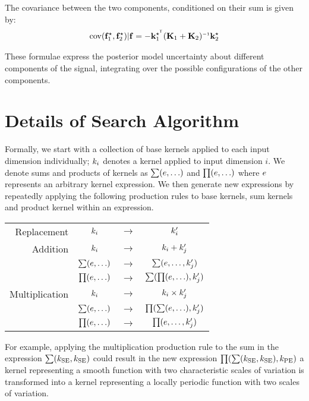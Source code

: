 \documentclass[twoside]{article}
\begin{document}
The covariance between the two components, conditioned on their sum is given by:
\begin{align}
\cov(\vf_1^\star, \vf_2^\star) | \vf = - \vk_1^{\star\tra} (\vK_1 + \vK_2)\inv \vk_2^\star
\end{align}

These formulae express the posterior model uncertainty about different components of the signal, integrating over the possible configurations of the other components.


\section{Details of Search Algorithm}

Formally, we start with a collection of base kernels applied to each input dimension individually; $k_i$ denotes a kernel applied to input dimension $i$.
We denote sums and products of kernels as $\sum(e,\ldots)$ and $\prod(e,\ldots)$ where $e$ represents an arbitrary kernel expression.
We then generate new expressions by repeatedly applying the following production rules to base kernels, sum kernels and product kernel within an expression.
\begin{center}
\begin{tabular}{rccc}
\textrm{Replacement} & $k_i$ & $\to$ & $k'_i$\\%
\textrm{Addition} & $k_i$ & $\to$ & $k_i + k'_j$\\%
& $\sum(e,\ldots)$ & $\to$ & $\sum(e,\ldots,k'_j)$\\%
& $\prod(e,\ldots)$ & $\to$ & $\sum(\prod(e,\ldots),k'_j)$\\%
\textrm{Multiplication} & $k_i$ &  $\to$ & $k_i \times k'_j$\\%
& $\sum(e,\ldots)$ & $\to$ & $\prod(\sum(e,\ldots),k'_j)$\\%
& $\prod(e,\ldots)$ & $\to$ & $\prod(e,\ldots,k'_j)$\\%
\end{tabular}
\end{center}
For example, applying the multiplication production rule to the sum in the expression $\sum(k_\textrm{SE},k_\textrm{SE})$ could result in the new expression $\prod(\sum(k_\textrm{SE},k_\textrm{SE}),k_\textrm{PE})$ \ie a kernel representing a smooth function with two characteristic scales of variation is transformed into a kernel representing a locally periodic function with two scales of variation.
\end{document}
